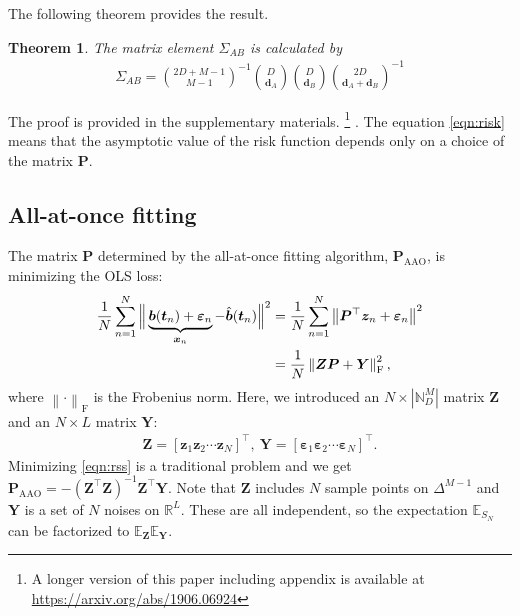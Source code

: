 \documentclass[letterpaper]{article} %
\theoremstyle{plain}
\newtheorem{theorem}{Theorem}
\newcommand{\norm}[1]{\left\| #1 \right\|}
\newcommand{\card}[1]{\left| #1 \right|}
\newcommand{\paren}[1]{\left( #1 \right)}
\newcommand{\sqbra}[1]{\left[#1 \right]}
\newcommand{\R}{\mathbb{R}}
\newcommand{\N}{\mathbb{N}}
\newcommand{\E}{\mathbb{E}}
\newcommand{\ZZ}{\Sigma}
\begin{document}
The following theorem provides the result.
\begin{theorem}\label{thm:risk}
The matrix element $\ZZ_{AB}$ is calculated by
\begin{align}
    \ZZ_{AB} =
        \binom{2D + M - 1}{M - 1}^{-1}
        \binom{D}{\bm d_A} \!
        \binom{D}{\bm d_B} \!
        \binom{2D}{\bm d_A + \bm d_B}^{-1}
        \label{eqn:ZZ-def}
\end{align}
\end{theorem}
The proof is provided in the supplementary materials. %
\footnote{A longer version of this paper including appendix is available at \url{https://arxiv.org/abs/1906.06924}}%
.
The equation \cref{eqn:risk} means that the asymptotic value of the risk function depends only on a choice of the matrix $\bm P$.


\subsection{All-at-once fitting}\label{sec:all-at-once-fitting}
The matrix $\bm P$ determined by the all-at-once fitting algorithm, $\bm P_\mathrm{AAO}$, is minimizing the OLS loss:
\begin{align}
    \frac{1}{N} \sum_{n = 1}^N \Big\| \underbrace{\bm b(\bm t_n) + \bm \varepsilon_n}_{\bm x_n}  - \hat{\bm b}(\bm t_n) \Big\|^2
    &= \frac{1}{N} \sum_{n = 1}^N \norm{\bm P^\top \bm z_n + \bm \varepsilon_n}^2 \notag \\
    &= \frac 1 N \norm{\bm Z \bm P + \bm Y}_{\mathrm F}^2, \label{eqn:rss}
\end{align}
where $\norm{\cdot}_\mathrm{F}$ is the Frobenius norm.
Here, we introduced an $N \times \card{\N_D^M}$ matrix $\bm Z$ and an $N \times L$ matrix $\bm Y$:
\begin{align}
    \bm Z = \sqbra{\bm z_1 \bm z_2 \cdots \bm z_N}^\top,\ 
    \bm Y = \sqbra{\bm \varepsilon_1 \bm \varepsilon_2 \cdots \bm \varepsilon_N}^\top.
\end{align}
Minimizing \cref{eqn:rss} is a traditional problem and we get $\bm P_\mathrm{AAO} = -\paren{\bm Z^\top \bm Z}^{-1}\bm Z^\top \bm Y$.
Note that $\bm Z$ includes $N$ sample points on $\Delta^{M - 1}$ and $\bm Y$ is a set of $N$ noises on $\R^L$.
These are all independent, so the expectation $\E_{S_N}$ can be factorized to $\E_{\bm Z} \E_{\bm Y}$.


\end{document}
